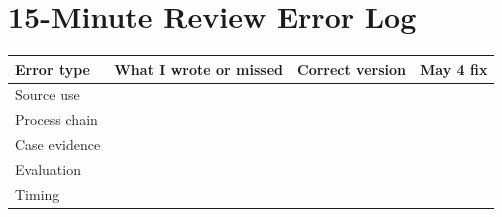 \documentclass[11pt,a4paper]{article}
\begin{document}
\section{15-Minute Review Error Log}

\begin{tabularx}{\textwidth}{L{0.18\textwidth}Y Y Y}
\toprule
\textbf{Error type} & \textbf{What I wrote or missed} & \textbf{Correct version} & \textbf{May 4 fix} \\
\midrule
Source use & \rule{0pt}{1.25cm} & & \\
Process chain & \rule{0pt}{1.25cm} & & \\
Case evidence & \rule{0pt}{1.25cm} & & \\
Evaluation & \rule{0pt}{1.25cm} & & \\
Timing & \rule{0pt}{1.25cm} & & \\
\bottomrule
\end{tabularx}
\end{document}
